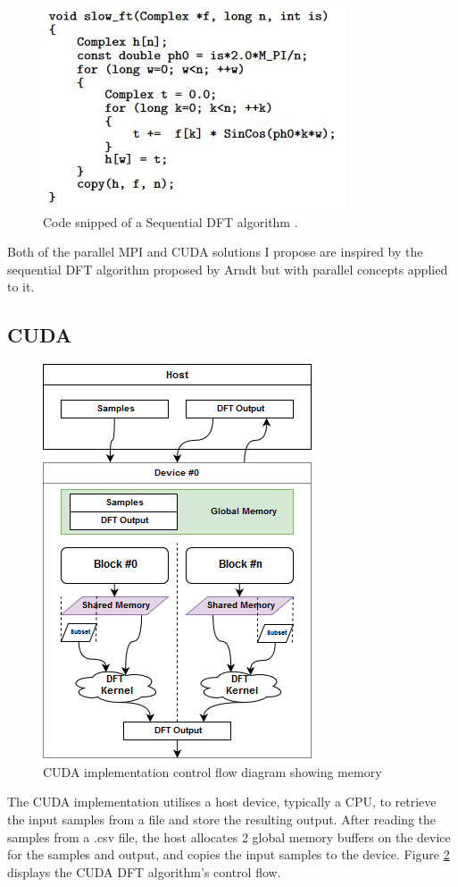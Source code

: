 \documentclass[11pt,a4paper]{article}
\begin{document}
\begin{figure}[H]
\begin{center}
\includegraphics[scale=0.6]{code_dft_afp}
\end{center}
\caption{Code snipped of a Sequential DFT algorithm \citep{arndt2002algorithms}.}
\label{fig:code_dft_afp}
\end{figure}

Both of the parallel MPI and CUDA solutions I propose are inspired by the sequential DFT algorithm proposed by Arndt \citep{arndt2002algorithms} but with parallel concepts applied to it.

\subsection{CUDA}

\begin{figure}
\begin{center}
\includegraphics[scale=0.6]{cuda_impl1}
\end{center}
\caption{CUDA implementation control flow diagram showing memory }
\label{fig:cuda_impl1}
\end{figure}
The CUDA implementation utilises a host device, typically a CPU, to retrieve the input samples from a file and store the resulting output.   After reading the samples from a .csv file, the host allocates 2 global memory buffers on the device for the samples and output, and copies the input samples to the device.  Figure \ref{fig:cuda_impl1} displays the CUDA DFT algorithm's control flow.
\end{document}
